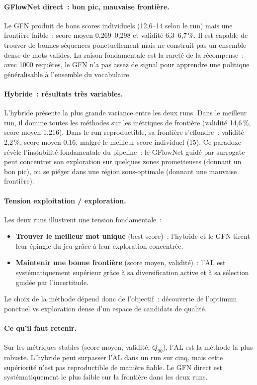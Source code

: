 \documentclass[10pt]{article}
\begin{document}
\paragraph{GFlowNet direct~: bon pic, mauvaise frontière.}
Le GFN produit de bons scores individuels (12,6--14 selon le run) mais une frontière faible~: score moyen 0,269--0,298 et validité 6,3--6,7\,\%. Il est capable de trouver de bonnes séquences ponctuellement mais ne construit pas un ensemble dense de mots valides. La raison fondamentale est la rareté de la récompense~: avec 1000 requêtes, le GFN n'a pas assez de signal pour apprendre une politique généralisable à l'ensemble du vocabulaire.

\paragraph{Hybride~: résultats très variables.}

L'hybride présente la plus grande variance entre les deux runs. Dans le meilleur run, il domine toutes les méthodes sur les métriques de frontière (validité 14,6\,\%, score moyen 1,216). Dans le run reproductible, sa frontière s'effondre~: validité 2,2\,\%, score moyen 0,16, malgré le meilleur score individuel (15). Ce paradoxe révèle l'instabilité fondamentale du pipeline~: le GFlowNet guidé par surrogate peut concentrer son exploration sur quelques zones prometteuses (donnant un bon pic), ou se piéger dans une région sous-optimale (donnant une mauvaise frontière).

\paragraph{Tension exploitation / exploration.}
Les deux runs illustrent une tension fondamentale~:
\begin{itemize}[noitemsep]
  \item \textbf{Trouver le meilleur mot unique} (best score)~: l'hybride et le GFN tirent leur épingle du jeu grâce à leur exploration concentrée.
  \item \textbf{Maintenir une bonne frontière} (score moyen, validité)~: l'AL est systématiquement supérieur grâce à sa diversification active et à sa sélection guidée par l'incertitude.
\end{itemize}
Le choix de la méthode dépend donc de l'objectif~: découverte de l'optimum ponctuel vs exploration dense d'un espace de candidats de qualité.

\paragraph{Ce qu'il faut retenir.}
Sur les métriques stables (score moyen, validité, $Q_{90}$), l'AL est la méthode la plus robuste. L'hybride peut surpasser l'AL dans un run sur cinq, mais cette supériorité n'est pas reproductible de manière fiable. Le GFN direct est systématiquement le plus faible sur la frontière dans les deux runs.
\end{document}

